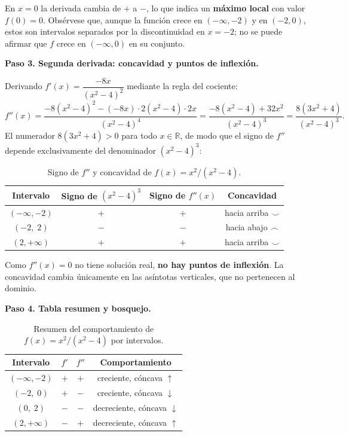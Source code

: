 \begin{example}[Trazado de $f(x)=x^2/(x^2-4)$]
\begin{myproof}
En $x=0$ la derivada cambia de $+$ a $-$, lo que indica un
\textbf{máximo local} con valor $f(0)=0$. Obsérvese que, aunque la
función crece en $(-\infty,-2)$ y en $(-2,0)$, estos son intervalos
separados por la discontinuidad en $x=-2$; no se puede afirmar que $f$
crece en $(-\infty,0)$ en su conjunto.

\textbf{Paso 3. Segunda derivada: concavidad y puntos de inflexión.}

Derivando $f'(x)=\dfrac{-8x}{(x^2-4)^2}$ mediante la regla del cociente:
\[
f''(x)
= \frac{-8(x^2-4)^2 - (-8x)\cdot 2(x^2-4)\cdot 2x}{(x^2-4)^4}
= \frac{-8(x^2-4)+32x^2}{(x^2-4)^3}
= \frac{8(3x^2+4)}{(x^2-4)^3}.
\]
El numerador $8(3x^2+4)>0$ para todo $x\in\mathbb{R}$, de modo que el
signo de $f''$ depende exclusivamente del denominador $(x^2-4)^3$:

\begin{table}[H]
\centering
\begin{tabular}{c c c c}
\toprule
Intervalo & Signo de $(x^2-4)^3$ & Signo de $f''(x)$ & Concavidad \\
\midrule
$(-\infty,-2)$ & $+$ & $+$ & hacia arriba $\smile$ \\
$(-2,\;2)$     & $-$ & $-$ & hacia abajo  $\frown$ \\
$(2,+\infty)$  & $+$ & $+$ & hacia arriba $\smile$ \\
\bottomrule
\end{tabular}
\caption{Signo de $f''$ y concavidad de $f(x)=x^2/(x^2-4)$.}
\end{table}

Como $f''(x)=0$ no tiene solución real, \textbf{no hay puntos de
inflexión}. La concavidad cambia únicamente en las asíntotas verticales,
que no pertenecen al dominio.

\textbf{Paso 4. Tabla resumen y bosquejo.}

\begin{table}[H]
\centering
\renewcommand{\arraystretch}{1.3}
\begin{tabular}{c c c c}
\toprule
Intervalo & $f'$ & $f''$ & Comportamiento \\
\midrule
$(-\infty,-2)$ & $+$ & $+$ & creciente, cóncava $\uparrow$ \\
$(-2,\;0)$     & $+$ & $-$ & creciente, cóncava $\downarrow$ \\
$(0,\;2)$      & $-$ & $-$ & decreciente, cóncava $\downarrow$ \\
$(2,+\infty)$  & $-$ & $+$ & decreciente, cóncava $\uparrow$ \\
\bottomrule
\end{tabular}
\caption{Resumen del comportamiento de $f(x)=x^2/(x^2-4)$ por intervalos.}
\end{table}


\end{myproof}
\end{example}
